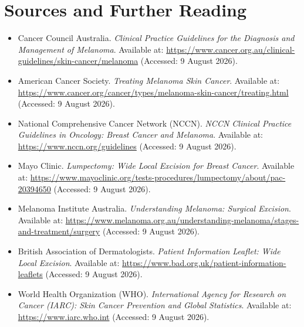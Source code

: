 \section*{Sources and Further Reading}
\begin{itemize}
    \item Cancer Council Australia. \textit{Clinical Practice Guidelines for the Diagnosis and Management of Melanoma}. Available at: \url{https://www.cancer.org.au/clinical-guidelines/skin-cancer/melanoma} (Accessed: 9 August 2026).
    \item American Cancer Society. \textit{Treating Melanoma Skin Cancer}. Available at: \url{https://www.cancer.org/cancer/types/melanoma-skin-cancer/treating.html} (Accessed: 9 August 2026).
    \item National Comprehensive Cancer Network (NCCN). \textit{NCCN Clinical Practice Guidelines in Oncology: Breast Cancer and Melanoma}. Available at: \url{https://www.nccn.org/guidelines} (Accessed: 9 August 2026).
    \item Mayo Clinic. \textit{Lumpectomy: Wide Local Excision for Breast Cancer}. Available at: \url{https://www.mayoclinic.org/tests-procedures/lumpectomy/about/pac-20394650} (Accessed: 9 August 2026).
    \item Melanoma Institute Australia. \textit{Understanding Melanoma: Surgical Excision}. Available at: \url{https://www.melanoma.org.au/understanding-melanoma/stages-and-treatment/surgery} (Accessed: 9 August 2026).
    \item British Association of Dermatologists. \textit{Patient Information Leaflet: Wide Local Excision}. Available at: \url{https://www.bad.org.uk/patient-information-leaflets} (Accessed: 9 August 2026).
    \item World Health Organization (WHO). \textit{International Agency for Research on Cancer (IARC): Skin Cancer Prevention and Global Statistics}. Available at: \url{https://www.iarc.who.int} (Accessed: 9 August 2026).
\end{itemize}